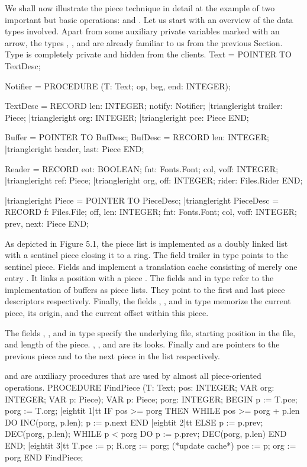 We shall now illustrate the piece technique in detail at the example of two important but basic operations:  and . Let us start with an overview of the data types involved. Apart from some auxiliary private variables marked with an arrow, the types , , and  are already familiar to us from the previous Section. Type  is completely private and hidden from the clients.
\begintt
Text = POINTER TO TextDesc;

Notifier = PROCEDURE (T: Text; op, beg, end: INTEGER);

TextDesc = RECORD
  len: INTEGER;
  notify: Notifier;
|triangleright trailer: Piece;
|triangleright org: INTEGER;
|triangleright pce: Piece
END;

Buffer = POINTER TO BufDesc;
BufDesc = RECORD
  len: INTEGER;
|triangleright header, last: Piece
END;

Reader = RECORD
  eot: BOOLEAN;
  fnt: Fonts.Font;
  col, voff: INTEGER;
|triangleright ref: Piece;
|triangleright org, off: INTEGER;
  rider: Files.Rider
END;

|triangleright Piece = POINTER TO PieceDesc;
|triangleright PieceDesc = RECORD
  f: Files.File;
  off, len: INTEGER;
  fnt: Fonts.Font;
  col, voff: INTEGER;
  prev, next: Piece
END;
\endtt

\noindent As depicted in Figure 5.1, the piece list is implemented as a doubly
linked list with a sentinel piece closing it to a ring. The field
trailer in type  points to the sentinel piece. Fields  and
 implement a translation cache consisting of merely one entry .
It links a position  with a piece . The fields  and  in type  refer to the implementation of buffers as piece
lists. They point to the first and last piece descriptors
respectively. Finally, the fields , , and  in type 
memorize the current piece, its origin, and the current offset within
this piece.

The fields , , and  in type  specify the underlying file, starting position in the file, and length of the piece. , , and  are its looks. Finally  and  are pointers to the previous piece and to the next piece in the list respectively.

 and  are auxiliary procedures that are used by almost all piece-oriented operations.
\begintt
PROCEDURE FindPiece (T: Text; pos: INTEGER;
                     VAR org: INTEGER; VAR p: Piece);
  VAR p: Piece;
      porg: INTEGER;
BEGIN
  p := T.pce;
  porg := T.org;
|eightit 1|tt IF pos >= porg THEN
    WHILE pos >= porg + p.len DO INC(porg, p.len); p := p.next END
|eightit 2|tt ELSE p := p.prev; DEC(porg, p.len);
    WHILE p < porg DO p := p.prev; DEC(porg, p.len) END
  END;
|eightit 3|tt T.pce := p; R.org := porg; (*update cache*)
  pce := p; org := porg
END FindPiece;
\endtt


